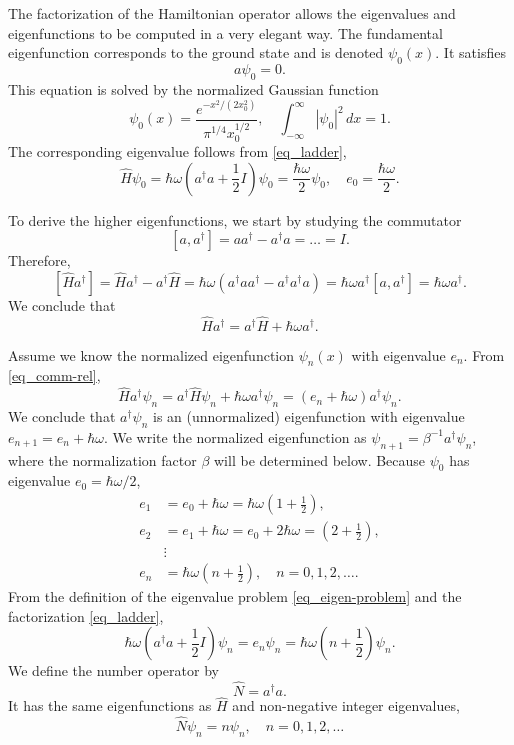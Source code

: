 \documentclass[11pt]{article}
\begin{document}
The factorization of the Hamiltonian operator allows the eigenvalues and eigenfunctions to be
computed in a very elegant way. The fundamental eigenfunction corresponds to the ground state and is
denoted $\psi_0(x)$. It satisfies
\[
a \psi_0 = 0.
\]
This equation is solved by the normalized Gaussian function
\[
\psi_0(x) = \frac{e^{-x^2/(2 x_0^2)}}{\pi^{1/4} x_0^{1/2}},\quad \int_{-\infty}^\infty |\psi_0|^2 \,
dx = 1.
\]
The corresponding eigenvalue follows from \eqref{eq_ladder},
\[
\hat{H}\psi_0 = \hbar\omega\left( a^\dag a + \frac{1}{2}I \right)\psi_0 = \frac{\hbar\omega}{2}
\psi_0,\quad e_0 = \frac{\hbar\omega}{2}.
\]

To derive the higher eigenfunctions, we start by studying the commutator
\begin{equation}\label{eq_a-commut}
[a,a^\dag] = a a^\dag - a^\dag a = \ldots = I.
\end{equation}
Therefore,
\[
  [\hat{H}a^\dag] = \hat{H}a^\dag - a^\dag \hat{H} = \hbar\omega(a^\dag a a^\dag - a^\dag a^\dag a) =
%
  \hbar\omega a^\dag[a,a^\dag] =   \hbar\omega a^\dag.
\]
We conclude that
\begin{equation}\label{eq_comm-rel}
\hat{H} a^\dag = a^\dag \hat{H} +  \hbar\omega a^\dag.
\end{equation}

Assume we know the normalized eigenfunction $\psi_n(x)$ with eigenvalue $e_n$. From
\eqref{eq_comm-rel},
\[
\hat{H} a^\dag\psi_n = a^\dag \hat{H} \psi_n + \hbar\omega a^\dag \psi_n = (e_n + \hbar\omega)
a^\dag \psi_n.
\]
We conclude that $a^\dag\psi_n$ is an (unnormalized) eigenfunction with
eigenvalue $e_{n+1} = e_n + \hbar\omega$. We write the normalized eigenfunction as
$\psi_{n+1} = \beta^{-1} a^\dag \psi_n$, where the normalization factor $\beta$ will be determined below.
Because $\psi_0$ has eigenvalue $e_0 = \hbar\omega/2$,
\begin{align*}
  e_1 &= e_0 + \hbar\omega = \hbar\omega\left( 1+\frac{1}{2} \right),\\
  e_2 &= e_1 + \hbar\omega = e_0 + 2\hbar\omega = \left( 2 + \frac{1}{2} \right),\\
  &\vdots\\
  e_n &= \hbar\omega\left( n + \frac{1}{2} \right),\quad n=0,1,2,\ldots.
\end{align*}
From the definition of the eigenvalue problem \eqref{eq_eigen-problem} and the factorization
\eqref{eq_ladder},
\[
\hbar\omega\left( a^\dag a + \frac{1}{2}I \right)\psi_n = e_n \psi_n = \hbar\omega\left( n +
\frac{1}{2} \right)\psi_n. 
\]
We define the number operator by
\begin{equation}\label{eq_numer-op}
\hat{N} = a^\dag a.
\end{equation}
It has the same eigenfunctions as $\hat{H}$ and non-negative integer eigenvalues,
\[
\hat{N}\psi_n = n \psi_n,\quad n=0,1,2,\ldots
\]
\end{document}
